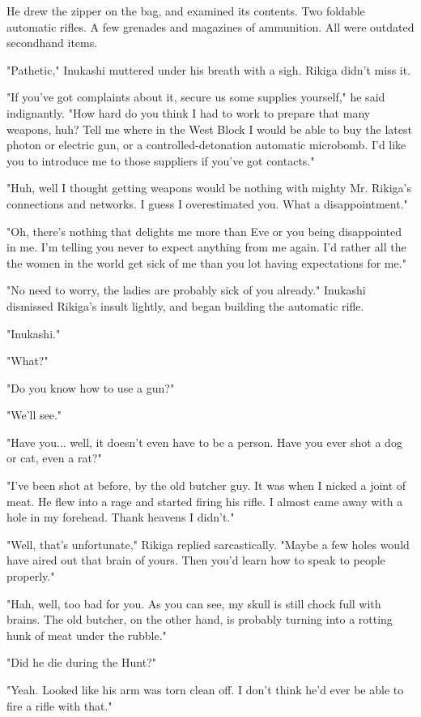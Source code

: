 He drew the zipper on the bag, and examined its contents. Two foldable
automatic rifles. A few grenades and magazines of ammunition. All were
outdated secondhand items.

"Pathetic," Inukashi muttered under his breath with a sigh. Rikiga
didn't miss it.

"If you've got complaints about it, secure us some supplies yourself,"
he said indignantly. "How hard do you think I had to work to prepare
that many weapons, huh? Tell me where in the West Block I would be able
to buy the latest photon or electric gun, or a controlled-detonation
automatic microbomb. I'd like you to introduce me to those suppliers if
you've got contacts."

"Huh, well I thought getting weapons would be nothing with mighty Mr.
Rikiga's connections and networks. I guess I overestimated you. What a
disappointment."

"Oh, there's nothing that delights me more than Eve or you being
disappointed in me. I'm telling you never to expect anything from me
again. I'd rather all the the women in the world get sick of me than you
lot having expectations for me."

"No need to worry, the ladies are probably sick of you already."
Inukashi dismissed Rikiga's insult lightly, and began building the
automatic rifle.

"Inukashi."

"What?"

"Do you know how to use a gun?"

"We'll see."

"Have you... well, it doesn't even have to be a person. Have you ever
shot a dog or cat, even a rat?"

"I've been shot at before, by the old butcher guy. It was when I nicked
a joint of meat. He flew into a rage and started firing his rifle. I
almost came away with a hole in my forehead. Thank heavens I didn't."

"Well, that's unfortunate," Rikiga replied sarcastically. "Maybe a few
holes would have aired out that brain of yours. Then you'd learn how to
speak to people properly."

"Hah, well, too bad for you. As you can see, my skull is still chock
full with brains. The old butcher, on the other hand, is probably
turning into a rotting hunk of meat under the rubble."

"Did he die during the Hunt?"

"Yeah. Looked like his arm was torn clean off. I don't think he'd ever
be able to fire a rifle with that."

